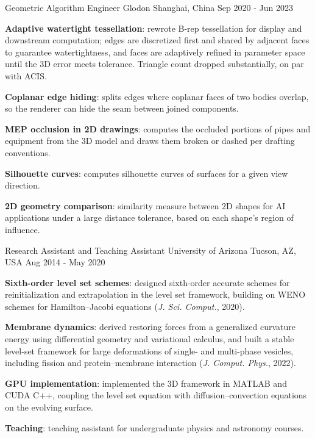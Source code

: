   \cventry
    {Geometric Algorithm Engineer} %
    {Glodon} %
    {Shanghai, China} %
    {Sep 2020 - Jun 2023} %
    {
      \begin{cvitems} %
        \item {\textbf{Adaptive watertight tessellation}: rewrote B-rep tessellation for display and downstream computation; edges are discretized first and shared by adjacent faces to guarantee watertightness, and faces are adaptively refined in parameter space until the 3D error meets tolerance. Triangle count dropped substantially, on par with ACIS.}
        \item {\textbf{Coplanar edge hiding}: splits edges where coplanar faces of two bodies overlap, so the renderer can hide the seam between joined components.}
        \item {\textbf{MEP occlusion in 2D drawings}: computes the occluded portions of pipes and equipment from the 3D model and draws them broken or dashed per drafting conventions.}
        \item {\textbf{Silhouette curves}: computes silhouette curves of surfaces for a given view direction.}
        \item {\textbf{2D geometry comparison}: similarity measure between 2D shapes for AI applications under a large distance tolerance, based on each shape's region of influence.}
      \end{cvitems}
    }

  \cventry
    {Research Assistant and Teaching Assistant} %
    {University of Arizona} %
    {Tucson, AZ, USA} %
    {Aug 2014 - May 2020} %
    {
      \begin{cvitems} %
        \item {\textbf{Sixth-order level set schemes}: designed sixth-order accurate schemes for reinitialization and extrapolation in the level set framework, building on WENO schemes for Hamilton--Jacobi equations (\textit{J. Sci. Comput.}, 2020).}
        \item {\textbf{Membrane dynamics}: derived restoring forces from a generalized curvature energy using differential geometry and variational calculus, and built a stable level-set framework for large deformations of single- and multi-phase vesicles, including fission and protein--membrane interaction (\textit{J. Comput. Phys.}, 2022).}
        \item {\textbf{GPU implementation}: implemented the 3D framework in MATLAB and CUDA C++, coupling the level set equation with diffusion--convection equations on the evolving surface.}
        \item {\textbf{Teaching}: teaching assistant for undergraduate physics and astronomy courses.}
      \end{cvitems}
    }
